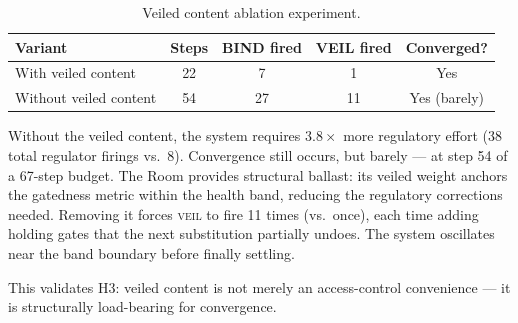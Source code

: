 \documentclass[sigconf,nonacm]{acmart}
\begin{document}
\begin{table}[t]
  \caption{Veiled content ablation experiment.}\label{tab:veiled}
  \small
  \begin{tabular}{@{}lcccc@{}}
    \toprule
    \textbf{Variant} & \textbf{Steps} & \textbf{BIND fired} & \textbf{VEIL fired} & \textbf{Converged?} \\
    \midrule
    With veiled content & 22 & 7 & 1 & Yes \\
    Without veiled content & 54 & 27 & 11 & Yes (barely) \\
    \bottomrule
  \end{tabular}
\end{table}

Without the veiled content, the system requires $3.8\times$ more
regulatory effort (38 total regulator firings vs.\ 8). Convergence
still occurs, but barely --- at step 54 of a 67-step budget.
The Room provides structural ballast: its veiled weight anchors the
gatedness metric within the health band, reducing the regulatory
corrections needed. Removing it forces \textsc{veil} to fire 11 times
(vs.\ once), each time adding holding gates that the next substitution
partially undoes. The system oscillates near the band boundary before
finally settling.

This validates H3: veiled content is not merely an access-control
convenience --- it is structurally load-bearing for convergence.
\end{document}

